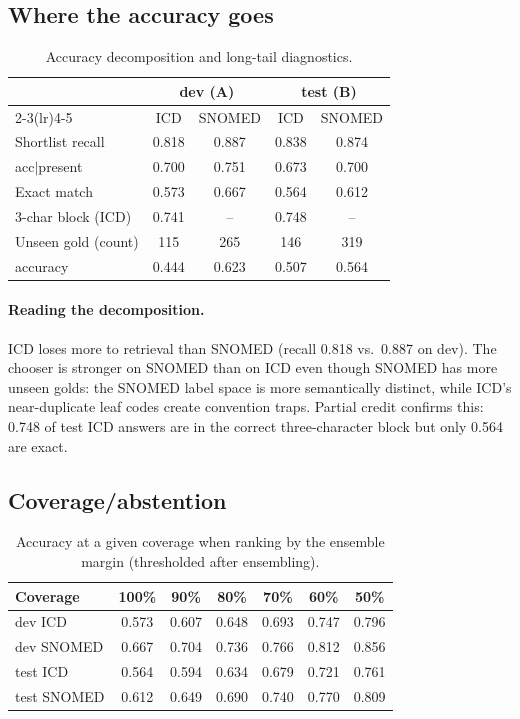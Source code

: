 \documentclass[11pt]{article}
\begin{document}
\subsection{Where the accuracy goes}
\begin{table}[H]
\centering
\small
\begin{tabular}{@{}lcccc@{}}
\toprule
 & \multicolumn{2}{c}{dev (A)} & \multicolumn{2}{c}{test (B)}\\
\cmidrule(lr){2-3}\cmidrule(lr){4-5}
 & ICD & SNOMED & ICD & SNOMED\\
\midrule
Shortlist recall & 0.818 & 0.887 & 0.838 & 0.874\\
acc$|$present & 0.700 & 0.751 & 0.673 & 0.700\\
Exact match & 0.573 & 0.667 & 0.564 & 0.612\\
3-char block (ICD) & 0.741 & -- & 0.748 & --\\
Unseen gold (count) & 115 & 265 & 146 & 319\\
\quad accuracy & 0.444 & 0.623 & 0.507 & 0.564\\
\bottomrule
\end{tabular}
\caption{Accuracy decomposition and long-tail diagnostics.}
\end{table}

\paragraph{Reading the decomposition.}
ICD loses more to retrieval than SNOMED (recall 0.818 vs.\ 0.887 on dev). The chooser is
stronger on SNOMED than on ICD even though SNOMED has more unseen golds: the SNOMED label
space is more semantically distinct, while ICD's near-duplicate leaf codes create
convention traps. Partial credit confirms this: 0.748 of test ICD answers are in the correct
three-character block but only 0.564 are exact.

\subsection{Coverage/abstention}
\begin{table}[H]
\centering
\small
\begin{tabular}{@{}lcccccc@{}}
\toprule
Coverage & 100\% & 90\% & 80\% & 70\% & 60\% & 50\%\\
\midrule
dev ICD & 0.573 & 0.607 & 0.648 & 0.693 & 0.747 & 0.796\\
dev SNOMED & 0.667 & 0.704 & 0.736 & 0.766 & 0.812 & 0.856\\
test ICD & 0.564 & 0.594 & 0.634 & 0.679 & 0.721 & 0.761\\
test SNOMED & 0.612 & 0.649 & 0.690 & 0.740 & 0.770 & 0.809\\
\bottomrule
\end{tabular}
\caption{Accuracy at a given coverage when ranking by the ensemble margin
(thresholded after ensembling).}
\label{tab:coverage}
\end{table}
\end{document}
